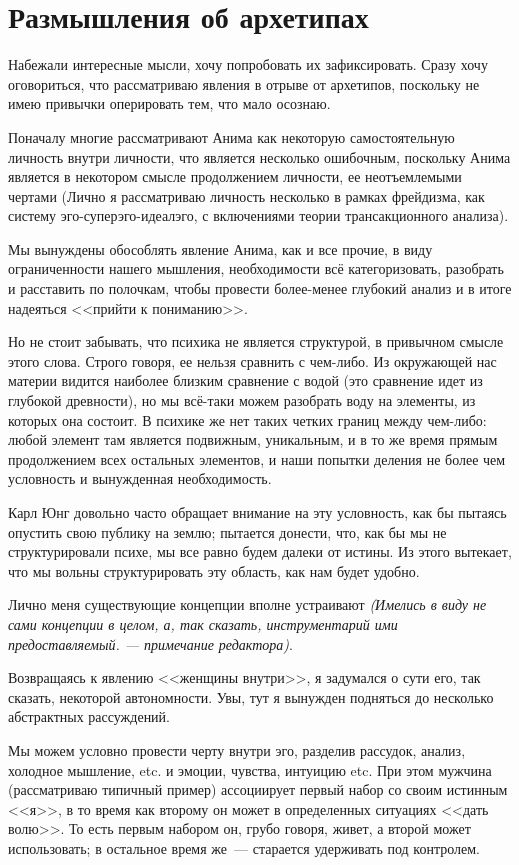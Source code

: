 \documentclass[a5paper,12pt,twoside]{memoir}
\begin{document}
\section{Размышления об архетипах}
Набежали интересные мысли, хочу попробовать их зафиксировать. Сразу хочу оговориться, что рассматриваю явления в отрыве от архетипов, поскольку не имею привычки оперировать тем, что мало осознаю.

Поначалу многие рассматривают Анима как некоторую самостоятельную личность внутри личности, что является несколько ошибочным, поскольку Анима является в некотором смысле продолжением личности, ее неотъемлемыми чертами (Лично я рассматриваю личность несколько в рамках фрейдизма, как систему эго-суперэго-идеалэго, с включениями теории трансакционного анализа).

Мы вынуждены обособлять явление Анима, как и все прочие, в виду ограниченности нашего мышления, необходимости всё категоризовать, разобрать и расставить по полочкам, чтобы провести более-менее глубокий анализ и в итоге надеяться <<прийти к пониманию>>.

Но не стоит забывать, что психика не является структурой, в привычном смысле этого слова. Строго говоря, ее нельзя сравнить с чем-либо. Из окружающей нас материи видится наиболее близким сравнение с водой (это сравнение идет из глубокой древности), но мы всё-таки можем разобрать воду на элементы, из которых она состоит. В психике же нет таких четких границ между чем-либо: любой элемент там является подвижным, уникальным, и в то же время прямым продолжением всех остальных элементов, и наши попытки деления не более чем условность и вынужденная необходимость.

Карл Юнг довольно часто обращает внимание на эту условность, как бы пытаясь опустить свою публику на землю; пытается донести, что, как бы мы не структурировали психе, мы все равно будем далеки от истины. Из этого вытекает, что мы вольны структурировать эту область, как нам будет удобно.

Лично меня существующие концепции вполне устраивают \textit{(Имелись в виду не сами концепции в целом, а, так сказать, инструментарий ими предоставляемый. --- примечание редактора)}.

Возвращаясь к явлению <<женщины внутри>>, я задумался о сути его, так сказать, некоторой автономности. Увы, тут я вынужден подняться до несколько абстрактных рассуждений.

Мы можем условно провести черту внутри эго, разделив рассудок, анализ, холодное мышление, etc. и эмоции, чувства, интуицию etc. При этом мужчина (рассматриваю типичный пример) ассоциирует первый набор со своим истинным <<я>>, в то время как второму он может в определенных ситуациях <<дать волю>>. То есть первым набором он, грубо говоря, живет, а второй может использовать; в остальное время же~--- старается удерживать под контролем. 
\end{document}
